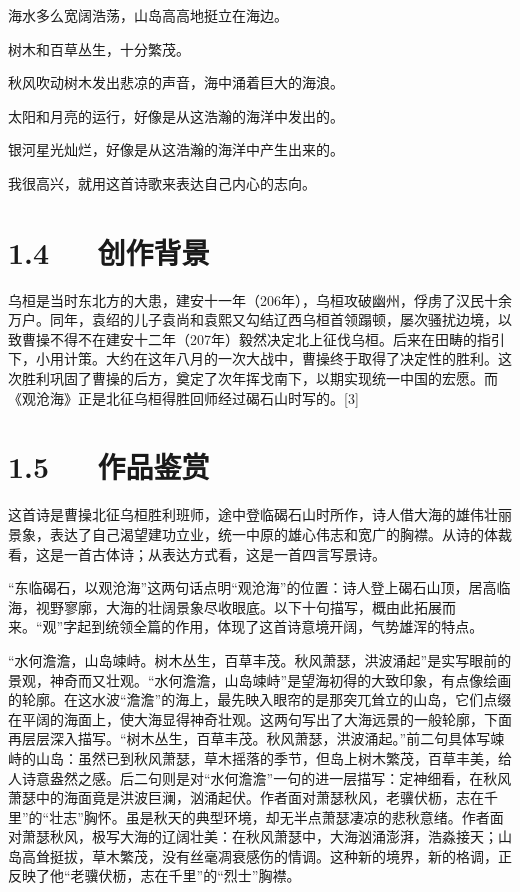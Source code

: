 \documentclass[letterpaper,10pt,english]{sphinxmanual}
\begin{document}
海水多么宽阔浩荡，山岛高高地挺立在海边。

树木和百草丛生，十分繁茂。

秋风吹动树木发出悲凉的声音，海中涌着巨大的海浪。

太阳和月亮的运行，好像是从这浩瀚的海洋中发出的。

银河星光灿烂，好像是从这浩瀚的海洋中产生出来的。

我很高兴，就用这首诗歌来表达自己内心的志向。


\section{1.4   创作背景}
\label{\detokenize{p01_u6563_u6587/_u66f9_u64cd-_u89c2_u6ca7_u6d77:id6}}
乌桓是当时东北方的大患，建安十一年（206年），乌桓攻破幽州，俘虏了汉民十余万户。同年，袁绍的儿子袁尚和袁熙又勾结辽西乌桓首领蹋顿，屡次骚扰边境，以致曹操不得不在建安十二年（207年）毅然决定北上征伐乌桓。后来在田畴的指引下，小用计策。大约在这年八月的一次大战中，曹操终于取得了决定性的胜利。这次胜利巩固了曹操的后方，奠定了次年挥戈南下，以期实现统一中国的宏愿。而《观沧海》正是北征乌桓得胜回师经过碣石山时写的。{[}3{]}


\section{1.5   作品鉴赏}
\label{\detokenize{p01_u6563_u6587/_u66f9_u64cd-_u89c2_u6ca7_u6d77:id7}}
这首诗是曹操北征乌桓胜利班师，途中登临碣石山时所作，诗人借大海的雄伟壮丽景象，表达了自己渴望建功立业，统一中原的雄心伟志和宽广的胸襟。从诗的体裁看，这是一首古体诗；从表达方式看，这是一首四言写景诗。

“东临碣石，以观沧海”这两句话点明“观沧海”的位置：诗人登上碣石山顶，居高临海，视野寥廓，大海的壮阔景象尽收眼底。以下十句描写，概由此拓展而来。“观”字起到统领全篇的作用，体现了这首诗意境开阔，气势雄浑的特点。

“水何澹澹，山岛竦峙。树木丛生，百草丰茂。秋风萧瑟，洪波涌起”是实写眼前的景观，神奇而又壮观。“水何澹澹，山岛竦峙”是望海初得的大致印象，有点像绘画的轮廓。在这水波“澹澹”的海上，最先映入眼帘的是那突兀耸立的山岛，它们点缀在平阔的海面上，使大海显得神奇壮观。这两句写出了大海远景的一般轮廓，下面再层层深入描写。“树木丛生，百草丰茂。秋风萧瑟，洪波涌起。”前二句具体写竦峙的山岛：虽然已到秋风萧瑟，草木摇落的季节，但岛上树木繁茂，百草丰美，给人诗意盎然之感。后二句则是对“水何澹澹”一句的进一层描写：定神细看，在秋风萧瑟中的海面竟是洪波巨澜，汹涌起伏。作者面对萧瑟秋风，老骥伏枥，志在千里”的“壮志”胸怀。虽是秋天的典型环境，却无半点萧瑟凄凉的悲秋意绪。作者面对萧瑟秋风，极写大海的辽阔壮美：在秋风萧瑟中，大海汹涌澎湃，浩淼接天；山岛高耸挺拔，草木繁茂，没有丝毫凋衰感伤的情调。这种新的境界，新的格调，正反映了他“老骥伏枥，志在千里”的“烈士”胸襟。
\end{document}
